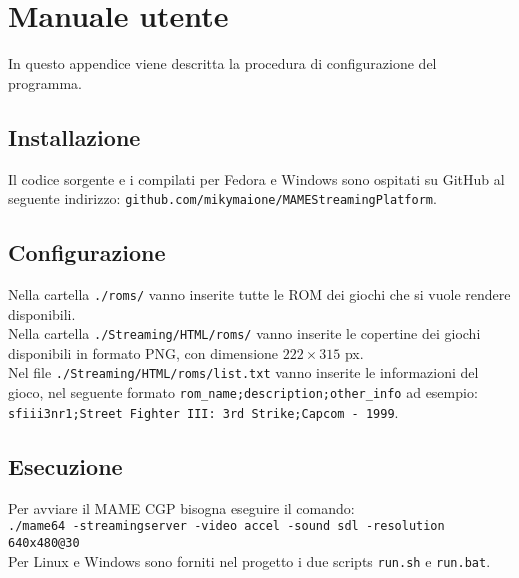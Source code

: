 \chapter{Manuale utente}
In questo appendice viene descritta la procedura di configurazione del programma.

\section{Installazione}
Il codice sorgente e i compilati per Fedora e Windows sono ospitati su GitHub al seguente indirizzo: \verb|github.com/mikymaione/MAMEStreamingPlatform|.

\section{Configurazione}
Nella cartella \verb|./roms/| vanno inserite tutte le ROM dei giochi che si vuole rendere disponibili.\\
Nella cartella \verb|./Streaming/HTML/roms/| vanno inserite le copertine dei giochi disponibili in formato PNG, con dimensione $222 \times 315$ px.\\
Nel file \verb|./Streaming/HTML/roms/list.txt| vanno inserite le informazioni del gioco, nel seguente formato \verb|rom_name;description;other_info| ad esempio:\\ \verb|sfiii3nr1;Street Fighter III: 3rd Strike;Capcom - 1999|.

\section{Esecuzione} \label{sec:chapMU_Esecuzione}
Per avviare il MAME CGP bisogna eseguire il comando:\\
\verb|./mame64 -streamingserver -video accel -sound sdl -resolution 640x480@30|\\
Per Linux e Windows sono forniti nel progetto i due scripts \verb|run.sh| e \verb|run.bat|.